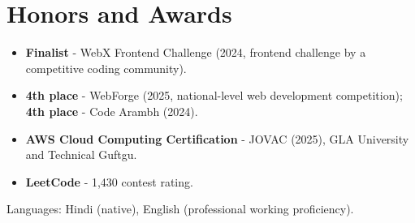 \documentclass[11pt,a4paper,sans]{moderncv}
\begin{document}

\section{Honors and Awards}
\vspace{1pt}
\begin{itemize}
    \item {\textbf{Finalist} - WebX Frontend Challenge (2024, frontend challenge by a competitive coding community).}
    \item {\textbf{4th place} - WebForge (2025, national-level web development competition); \textbf{4th place} - Code Arambh (2024).}
    \item {\textbf{AWS Cloud Computing Certification} - JOVAC (2025), GLA University and Technical Guftgu.}
    \item {\textbf{LeetCode} - 1,430 contest rating.}
\end{itemize}


\vspace{1pt}
\small{Languages: Hindi (native), English (professional working proficiency).}
\end{document}
